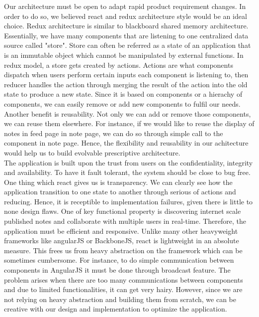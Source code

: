 \documentclass[12pt]{article}
\begin{document}
  Our architecture must be open to adapt rapid product requirement changes. In order to do so, we believed react and redux architecture style would be an ideal choice. Redux architecture is similar to blackboard shared memory architecture. Essentially, we have many components that are listening to one centralized data source called "store". Store can often be referred as a state of an application that is an immutable object which cannot be manipulated by external functions. In redux model, a store gets created by actions. Actions are what components dispatch when users perform certain inputs each component is listening to, then reducer handles the action through merging the result of the action into the old state to produce a new state. Since it is based on components or a hierachy of components, we can easily remove or add new components to fulfil our needs. Another benefit is reusability. Not only we can add or remove those components, we can reuse them elsewhere. For instance, if we would like to reuse the display of notes in feed page in note page, we can do so through simple call to the component in note page. Hence, the flexibility and reusability in our achitecture would help us to build evolvable prescriptive architecture. \\

  The application is built upon the trust from users on the confidentiality, integrity and availability. To have it fault tolerant, the system should be close to bug free. One thing which react gives us is transparency. We can clearly see how the application transition to one state to another through serious of actions and reducing. Hence, it is receptible to implementation failures, given there is little to none design flaws. One of key functional property is discovering internet scale published notes and collaborate with multiple users in real-time. Therefore, the application must be efficient and responsive. Unlike many other heavyweight frameworks like angularJS or BackboneJS, react is lightweight in an absolute measure. This frees us from heavy abstraction on the framework which can be sometimes cumbersome. For instance, to do simple communication between components in AngularJS it must be done through broadcast feature. The problem arises when there are too many communications between components and due to limited functionalities, it can get very hairy. However, since we are not relying on heavy abstraction and building them from scratch, we can be  creative with our design and implementation to optimize the application. \\
\end{document}
